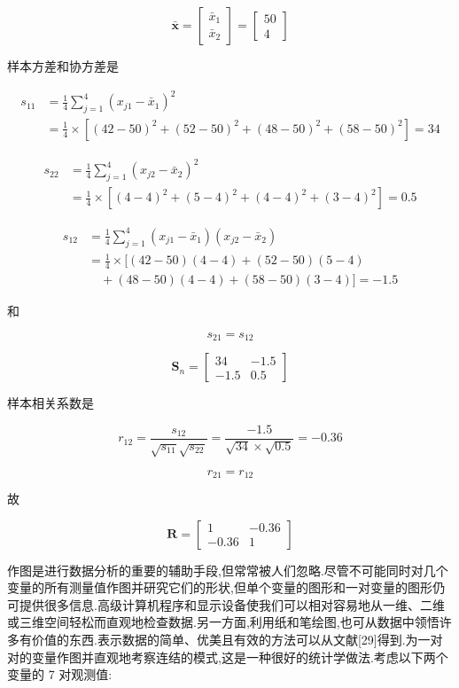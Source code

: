 
\[
\bar{\bm{x}} = \begin{bmatrix} \bar{x}_1 \\ \bar{x}_2 \end{bmatrix} = \begin{bmatrix} 50 \\ 4 \end{bmatrix}
\]

样本方差和协方差是

\[
\begin{aligned}
s_{11} &= \frac{1}{4}\sum_{j=1}^{4}(x_{j1}-\bar{x}_1)^2 \\
&= \frac{1}{4}\times[(42-50)^2+(52-50)^2+(48-50)^2+(58-50)^2]=34
\end{aligned}
\]

\[
\begin{aligned}
s_{22} &= \frac{1}{4}\sum_{j=1}^{4}(x_{j2}-\bar{x}_2)^2 \\
&= \frac{1}{4}\times[(4-4)^2+(5-4)^2+(4-4)^2+(3-4)^2]=0.5
\end{aligned}
\]

\[
\begin{aligned}
s_{12} &= \frac{1}{4}\sum_{j=1}^{4}(x_{j1}-\bar{x}_1)(x_{j2}-\bar{x}_2) \\
&= \frac{1}{4}\times[(42-50)(4-4)+(52-50)(5-4) \\
&\quad +(48-50)(4-4)+(58-50)(3-4)]=-1.5
\end{aligned}
\]

和

\[
s_{21}=s_{12}
\]

\[
\bm{S}_n = \begin{bmatrix} 34 & -1.5 \\ -1.5 & 0.5 \end{bmatrix}
\]

样本相关系数是

\[
r_{12} = \frac{s_{12}}{\sqrt{s_{11}}\sqrt{s_{22}}} = \frac{-1.5}{\sqrt{34}\times\sqrt{0.5}} = -0.36
\]

\[
r_{21}=r_{12}
\]

故

\[
\bm{R} = \begin{bmatrix} 1 & -0.36 \\ -0.36 & 1 \end{bmatrix}
\]


作图是进行数据分析的重要的辅助手段,但常常被人们忽略.尽管不可能同时对几个变量的所有测量值作图并研究它们的形状,但单个变量的图形和一对变量的图形仍可提供很多信息.高级计算机程序和显示设备使我们可以相对容易地从一维、二维或三维空间轻松而直观地检查数据.另一方面,利用纸和笔绘图,也可从数据中领悟许多有价值的东西.表示数据的简单、优美且有效的方法可以从文献[29]得到.为一对对的变量作图并直观地考察连结的模式,这是一种很好的统计学做法.考虑以下两个变量的 7 对观测值:


